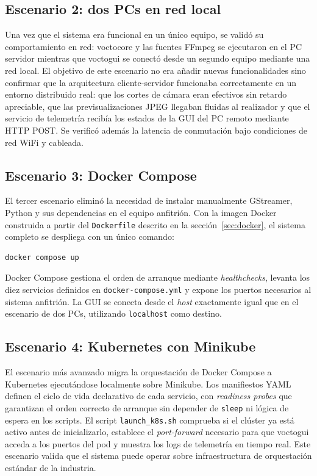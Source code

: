 \subsection{Escenario 2: dos PCs en red local}

Una vez que el sistema era funcional en un único equipo, se validó su comportamiento
en red: voctocore y las fuentes FFmpeg se ejecutaron en el PC servidor mientras que
voctogui se conectó desde un segundo equipo mediante una red local. El objetivo de
este escenario no era añadir nuevas funcionalidades sino confirmar que la arquitectura
cliente-servidor funcionaba correctamente en un entorno distribuido real: que los
cortes de cámara eran efectivos sin retardo apreciable, que las previsualizaciones
JPEG llegaban fluidas al realizador y que el servicio de telemetría recibía los estados
de la GUI del PC remoto mediante HTTP POST. Se verificó además la latencia de
conmutación bajo condiciones de red WiFi y cableada.

\subsection{Escenario 3: Docker Compose}

El tercer escenario eliminó la necesidad de instalar manualmente GStreamer, Python y
sus dependencias en el equipo anfitrión. Con la imagen Docker construida a partir del
\texttt{Dockerfile} descrito en la sección~\ref{sec:docker}, el sistema completo se
despliega con un único comando:

\begin{verbatim}
docker compose up
\end{verbatim}

Docker Compose gestiona el orden de arranque mediante \textit{healthchecks}, levanta
los diez servicios definidos en \texttt{docker-compose.yml} y expone los puertos
necesarios al sistema anfitrión. La GUI se conecta desde el \textit{host} exactamente
igual que en el escenario de dos PCs, utilizando \texttt{localhost} como destino.

\subsection{Escenario 4: Kubernetes con Minikube}

El escenario más avanzado migra la orquestación de Docker Compose a Kubernetes
ejecutándose localmente sobre Minikube. Los manifiestos YAML definen el ciclo de vida
declarativo de cada servicio, con \textit{readiness probes} que garantizan el orden
correcto de arranque sin depender de \texttt{sleep} ni lógica de espera en los scripts.
El script \texttt{launch\_k8s.sh} comprueba si el clúster ya está activo antes de
inicializarlo, establece el \textit{port-forward} necesario para que voctogui acceda
a los puertos del pod y muestra los logs de telemetría en tiempo real. Este escenario
valida que el sistema puede operar sobre infraestructura de orquestación estándar de
la industria.

